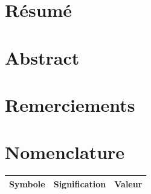 \documentclass[12pt, a4paper]{article}%
\begin{document}
\section*{Résumé}{
}
\section*{Abstract}{
}
\section*{Remerciements}{
}
\newpage

\tableofcontents
\newpage
\listoffigures
\listoftables
\newpage

\section*{Nomenclature}{
\begin{table}[H]
    \begin{tabular}{l c c} %
        \toprule
        Symbole & Signification & Valeur \\
        \midrule

        \bottomrule
    \end{tabular}
\end{table}
      
}

\newpage

\newpage    
{}



\newpage
\thispagestyle{empty}
\nocite{*}
\printbibliography[title = Bibliographie] %




% 
\end{document}

